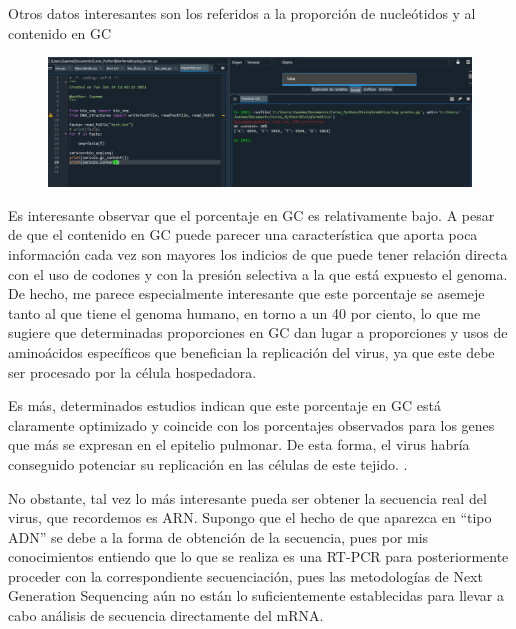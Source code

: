 \documentclass[12pt]{article}
\begin{document}
Otros datos interesantes son los referidos a la proporción de nucleótidos y al contenido en GC
\newline
\begin{figure}[H]
\centering
\includegraphics[scale=0.4]{Screenshot_4}
\end{figure}
Es interesante observar que el porcentaje en GC es relativamente bajo. A pesar de que el contenido en GC puede parecer una característica que aporta poca información cada vez son mayores los indicios de que puede tener relación directa con el uso de codones y con la presión selectiva a la que está expuesto el genoma. De hecho, me parece especialmente interesante que este porcentaje se asemeje tanto al que tiene el genoma humano, en torno a un 40 por ciento, lo que me sugiere que determinadas proporciones en GC dan lugar a proporciones y usos de aminoácidos específicos que benefician la replicación del virus, ya que este debe ser procesado por la célula hospedadora. 
\newline

Es más, determinados estudios indican que este porcentaje en GC está claramente optimizado y coincide con los porcentajes observados para los genes que más se expresan en el epitelio pulmonar. De esta forma, el virus habría conseguido potenciar su replicación en las células de este tejido. \cite{Li20201537}.
\newline

No obstante, tal vez lo más interesante pueda ser obtener la secuencia real del virus, que recordemos es ARN. Supongo que el hecho de que aparezca en “tipo ADN” se debe a la forma de obtención de la secuencia, pues por mis conocimientos entiendo que lo que se realiza es una RT-PCR para posteriormente proceder con la correspondiente secuenciación, pues las metodologías de Next Generation Sequencing aún no están lo suficientemente establecidas para llevar a cabo análisis de secuencia directamente del mRNA. 
\newline
\end{document}
